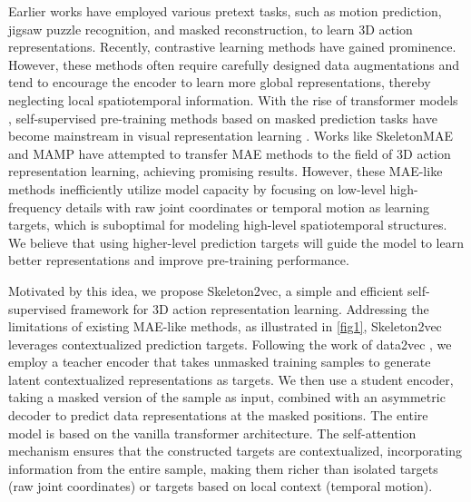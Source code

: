 Earlier works \cite{lin2020ms2l, nie2020unsupervised, su2020predict, zheng2018unsupervised}
have employed various pretext tasks, such as motion prediction, jigsaw puzzle recognition,
and masked reconstruction, to learn 3D action representations. Recently, contrastive
learning methods \cite{rao2021augmented, guo2022contrastive, moliner2022bootstrapped, lin2023actionlet}
have gained prominence. However, these methods often require carefully designed
data augmentations and tend to encourage the encoder to learn more global
representations, thereby neglecting local spatiotemporal information.
With the rise of transformer models \cite{vaswani2017attention}, self-supervised
pre-training methods based on masked prediction tasks have become mainstream in
visual representation learning \cite{rao2021augmented, guo2022contrastive, moliner2022bootstrapped, lin2023actionlet}.
Works like SkeletonMAE \cite{yan2023skeletonmae, wu2023skeletonmae} and MAMP \cite{mao2023masked} have
attempted to transfer MAE \cite{he2022masked} methods to the field of 3D action representation
learning, achieving promising results. However, these MAE-like methods inefficiently
utilize model capacity by focusing on low-level high-frequency details with
raw joint coordinates or temporal motion as learning targets, which is suboptimal
for modeling high-level spatiotemporal structures. We believe that using
higher-level prediction targets will guide the model to learn better representations
and improve pre-training performance.

Motivated by this idea, we propose Skeleton2vec, a simple and efficient self-supervised
framework for 3D action representation learning. Addressing the limitations of existing
MAE-like methods, as illustrated in \cref{fig1}, Skeleton2vec leverages contextualized
prediction targets. Following the work of data2vec \cite{baevski2022data2vec, baevski2023efficient},
we employ a teacher encoder that takes unmasked training samples to generate latent
contextualized representations as targets. We then use a student encoder, taking a
masked version of the sample as input, combined with an asymmetric decoder to
predict data representations at the masked positions. The entire model is based on the
vanilla transformer architecture. The self-attention mechanism ensures that the
constructed targets are contextualized, incorporating information from the entire
sample, making them richer than isolated targets (\eg raw joint coordinates)
or targets based on local context (\eg temporal motion).

